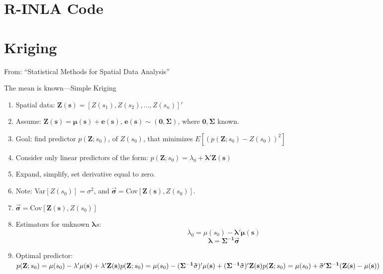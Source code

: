 \documentclass{article}
\begin{document}
\section{R-INLA Code}

\section{Kriging}

From: ``Statistical Methods for Spatial Data Analysis'' \citep{Schabenberger2004}

The mean is known---Simple Kriging
\begin{enumerate}
\item Spatial data: $\mathbf{Z(s)} = [Z(s_{1}), Z(s_{2}),\hdots, Z(s_{n})]'$

\item Assume: $\mathbf{Z(s) = \mu(s) + e(s)}$, $\mathbf{e(s) \sim (0, \Sigma)}$, where $\mathbf{0, \Sigma}$ known.

\item Goal: find predictor $p(\mathbf{Z};s_{0})$, of $Z(s_{0})$, that minimizes $E\left[ \left(p(\mathbf{Z};s_{0}) - Z(s_{0}) \right)^{2}\right]$ 

\item Consider only linear predictors of the form: $p(\mathbf{Z};s_{0}) = \lambda_{0} + \mathbf{\lambda 'Z(s)}$

\item Expand, simplify, set derivative equal to zero.

\item Note: Var$[Z(s_{0})] = \sigma^{2}$, and $\mathbf{\vec{\sigma} =}$Cov$[\mathbf{Z(s)},Z(s_{0})]$.

\item $\mathbf{\vec{\sigma} =}$Cov$[\mathbf{Z(s)},Z(s_{0})]$

\item Estimators for unknown $\mathbf{\lambda}s$:
$$ \lambda_{0} = \mu(s_{0}) - \mathbf{\lambda'\mu(s)} $$
$$ \mathbf{\lambda = \Sigma^{-1}\vec{\sigma}} $$

\item Optimal predictor: \\ 
$p(\mathbf{Z};s_{0}) = \mu(s_{0}) - \mathbf{\lambda'\mu(s)} + \mathbf{\lambda}'\mathbf{Z(s)} \\
p(\mathbf{Z};s_{0}) = \mu(s_{0}) - (\mathbf{\Sigma^{-1}\vec{\sigma}})'\mathbf{\mu(s)} + (\mathbf{\Sigma^{-1}\vec{\sigma}})'\mathbf{Z(s)} \\
p(\mathbf{Z};s_{0}) = \mu(s_{0}) + \mathbf{ \vec{\sigma}'\Sigma^{-1}(Z(s) - \mu(s)) }$


\end{enumerate}
\end{document}
